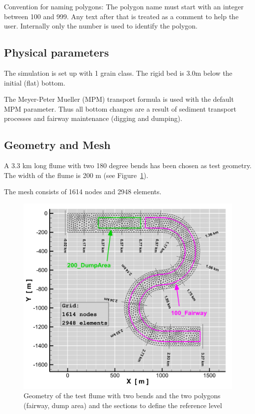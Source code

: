 Convention for naming polygons: The polygon name must start with an integer between 100 and 999. Any text after that is treated as a comment to  help the user.
Internally only the number is used to identify the polygon.




%
%
\subsection{Physical parameters}
%
The simulation is set up with 1 grain class.
The rigid bed is 3.0m below the initial (flat) bottom.

The Meyer-Peter Mueller (MPM) transport formula is used with the default MPM parameter. Thus all bottom changes are a result of sediment transport processes and fairway maintenance (digging and dumping).
%
%
\subsection{Geometry and Mesh}
%
A 3.3 km long flume with two 180 degree bends has been chosen as test geometry.
The width of the flume is 200 m  (see Figure~\ref{grid}).

The mesh consists of 1614 nodes and 2948 elements.

\begin{figure} [!h]
\centering
\includegraphics[scale=0.14]{critDig_grid_Polys_2D.png}
\caption{Geometry of the test flume with two bends and the two polygons (fairway, dump area) and the sections to define the reference level}\label{grid}
\end{figure}


